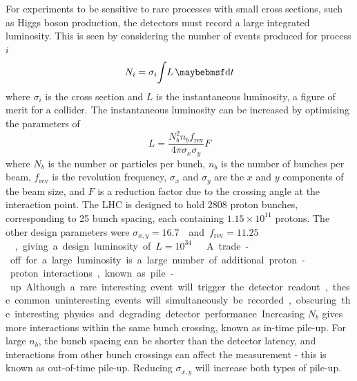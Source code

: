 For experiments to be sensitive to rare processes with small cross sections, such as Higgs 
boson production, the detectors must record a large integrated luminosity. This is seen by 
considering the number of events produced for process $i$
\begin{equation}
	N_i = \sigma_i \! \int \! L \, \diff t
\end{equation}
where $\sigma_i$ is the cross section and $L$ is the instantaneous luminosity, a figure of 
merit for a collider. The instantaneous luminosity can be increased by optimising the
parameters of
\begin{equation}
	L = \frac{N_b^2 n_b f_{\text{rev}}}{4\pi \sigma_x \sigma_y} F
\end{equation}
where $N_b$ is the number or particles per bunch, $n_b$ is the number of bunches per beam, 
$f_{\text{rev}}$ is the revolution frequency, $\sigma_x$ and $\sigma_y$ are the $x$ and $y$
components of the beam size, and $F$ is a reduction factor due to the crossing angle at 
the interaction point. The \ac{LHC} is designed to hold 2808 proton bunches, corresponding 
to \unit{25}{\nano\second} bunch spacing, each containing $1.15\times10^{11}$ protons. The 
other design parameters were \unit{$\sigma_{x,y} = 16.7$}{\micro\metre} and 
\unit{$f_{\text{rev}} = 11.25$}{\kHz}, giving a design luminosity of 
\unit{$L = 10^{34}$}{\lumiunits} \cite{LHC}.

A trade-off for a large luminosity is a large number of additional proton-proton 
interactions, known as pile-up. Although a rare interesting event will trigger the 
detector readout, these common uninteresting events will simultaneously be recorded, 
obscuring the interesting physics and degrading detector performance. Increasing $N_b$ 
gives more interactions within the same bunch crossing, known as in-time pile-up. For 
large $n_b$, the bunch spacing can be shorter than the detector latency, and interactions 
from other bunch crossings can affect the measurement - this is known as out-of-time 
pile-up. Reducing $\sigma_{x,y}$ will increase both types of pile-up.

